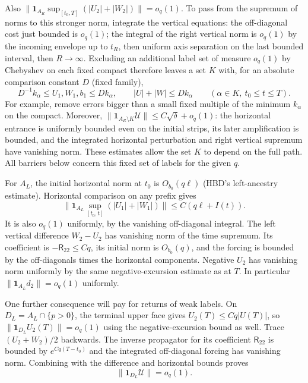 \documentclass[11pt]{article}
\newcommand{\norm}[1]{\lVert #1\rVert}
\begin{document}
Also $\norm{\mathbf1_{A_R}\sup_{[t_0,T]}(|U_2|+|W_2|)}=o_q(1)$.
To pass from the supremum of norms to this stronger norm, integrate
the vertical equations: the off-diagonal cost just bounded is $o_q(1)$;
the integral of the right vertical norm is $o_q(1)$ by the incoming
envelope up to $t_R$, then uniform axis separation on the last bounded
interval, then $R\to\infty$. Excluding an additional label set of measure
$o_q(1)$ by Chebyshev on each fixed compact therefore leaves a set $K$
with, for an absolute comparison constant $D$ (fixed family),
\begin{equation}
 D^{-1}k_\alpha\le U_1,W_1,b_1\le D k_\alpha,\qquad
 |U|+|W|\le D k_\alpha\qquad(\alpha\in K,\ t_0\le t\le T).
 \label{an04ce5v1:bulk}
\end{equation}
For example, remove errors bigger than a small fixed multiple of the
minimum $k_\alpha$ on the compact. Moreover,
$\norm{\mathbf1_{A_R\setminus K}\mathcal U}\le C\sqrt\delta+o_q(1)$:
the horizontal entrance is uniformly bounded even on the initial strips,
its later amplification is bounded, and the integrated horizontal
perturbation and right vertical supremum have vanishing norm.
These estimates allow the set $K$ to depend on the full path. All
barriers below concern this fixed set of labels for the given $q$.

For $A_L$, the initial horizontal norm at $t_0$ is $O_{b_0}(q\ell)$
(HBD's left-ancestry estimate). Horizontal comparison on any prefix gives
\begin{equation}
 \norm{\mathbf1_{A_L}\sup_{[t_0,t]}(|U_1|+|W_1|)}
 \le C(q\ell+I(t)).
 \label{an04ce5v1:left}
\end{equation}
It is also $o_q(1)$ uniformly, by the vanishing off-diagonal integral.
The left vertical difference $W_2-U_2$ has vanishing norm of the time
supremum. Its coefficient is $-\mathsf R_{22}\le Cq$, its initial norm
is $O_{b_0}(q)$, and the forcing is bounded by the off-diagonals times
the horizontal components. Negative $U_2$ has vanishing norm uniformly
by the same negative-excursion estimate as at $T$. In particular
$\norm{\mathbf1_{A_L} d_2}=o_q(1)$ uniformly.

One further consequence will pay for returns of weak labels. On
$D_L=A_L\cap\{p>0\}$, the terminal upper face gives
$U_2(T)\le Cq|U(T)|$, so $\norm{\mathbf1_{D_L}U_2(T)}=o_q(1)$ using
the negative-excursion bound as well. Trace $(U_2+W_2)/2$ backwards.
The inverse propagator for its coefficient $\mathsf R_{22}$ is bounded
by $e^{Cq(T-t_0)}$ and the integrated off-diagonal forcing has vanishing
norm. Combining with the difference and horizontal bounds proves
\begin{equation}
 \norm{\mathbf1_{D_L}\mathcal U}=o_q(1).
 \label{an04ce5v1:activeleft}
\end{equation}
\end{document}

